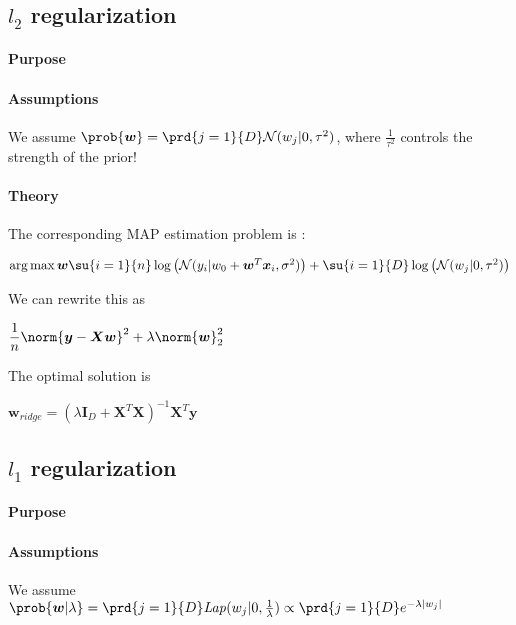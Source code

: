 \subsection{$l_{2}$ regularization}
\paragraph{Purpose}

\paragraph{Assumptions}
We assume $\prob{\bm{w}} = \prd{j=1}{D}\mathcal{N}(w_{j} |0,\tau^{2})$, where
$\frac{1}{\tau^{2}}$ controls the strength of the prior! 

\paragraph{Theory}
The corresponding MAP estimation problem is :

\begin{center}
    $\argmax{\bm{w}}\su{i=1}{n}\log\left(\mathcal{N}(y_{i}|w_{0} +
    \bm{w}^{T}\bm{x}_{i}, \sigma^{2})\right) + \su{i=1}{D}\log\left(\mathcal{N}(w_{j}
|0, \tau^{2})\right)$
\end{center}
We can rewrite this as 
\begin{center}
    $\dfrac{1}{n}\norm{\bm{y} - \bm{X}\bm{w}}^{2} + \lambda\norm{\bm{w}}^{2}_{2}$
\end{center}
The optimal solution is 
\begin{center}
    $\bm{w}_{ridge} = \left(\lambda\bm{I}_{D} + \bm{X}^{T}\bm{X}\right)^{-1}\bm{X}^{T}
    \bm{y}$
\end{center}





\subsection{$l_{1}$ regularization}
\paragraph{Purpose}

\paragraph{Assumptions}
We assume $\prob{\bm{w}|\lambda} = \prd{j=1}{D}\text{\emph{Lap}}(w_{j}|0,
\frac{1}{\lambda}) \propto \prd{j=1}{D}e^{-\lambda|w_{j}|}$
